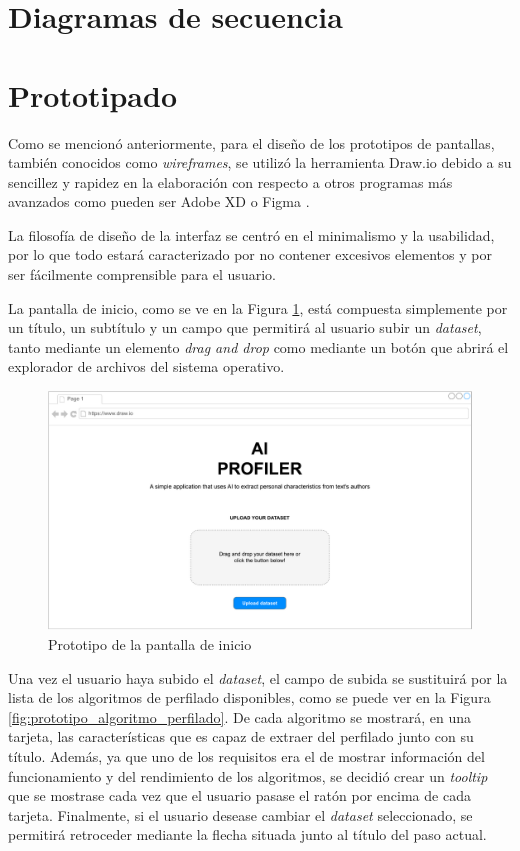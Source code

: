 \section{Diagramas de secuencia}
\label{sec:diseño_secuencia}

\section{Prototipado}
\label{sec:diseño_prototipado}

Como se mencionó anteriormente, para el diseño de los prototipos de pantallas, también conocidos como \textit{wireframes}, se utilizó
la herramienta Draw.io \cite{drawio} debido a su sencillez y rapidez en la elaboración con respecto a otros programas más avanzados
como pueden ser Adobe XD \cite{adobexd} o Figma \cite{figma}.

\bigskip
La filosofía de diseño de la interfaz se centró en el minimalismo y la usabilidad, por lo que todo estará caracterizado por no
contener excesivos elementos y por ser fácilmente comprensible para el usuario. 

\bigskip
La pantalla de inicio, como se ve en la Figura \ref{fig:prototipo_inicio}, está compuesta simplemente por un título, 
un subtítulo y un campo que permitirá al usuario subir un \textit{dataset}, tanto mediante un elemento \textit{drag and drop} como
mediante un botón que abrirá el explorador de archivos del sistema operativo.

\bigskip
\begin{figure}[H]
	\centering
	\includegraphics[width=\textwidth]{diagramas/landing.pdf}
	\caption{Prototipo de la pantalla de inicio}
	\label{fig:prototipo_inicio}
\end{figure}

\bigskip
Una vez el usuario haya subido el \textit{dataset}, el campo de subida se sustituirá por la lista de los
algoritmos de perfilado disponibles, como se puede ver en la Figura \ref{fig:prototipo_algoritmo_perfilado}. De cada algoritmo se mostrará, en una tarjeta, las características que es capaz de extraer
del perfilado junto con su título. Además, ya que uno de los requisitos era el de mostrar información del funcionamiento
y del rendimiento de los algoritmos, se decidió crear un \textit{tooltip} que se mostrase cada vez que el usuario pasase el ratón
por encima de cada tarjeta. Finalmente, si el usuario desease cambiar el \textit{dataset} seleccionado, se permitirá retroceder mediante
la flecha situada junto al título del paso actual.

